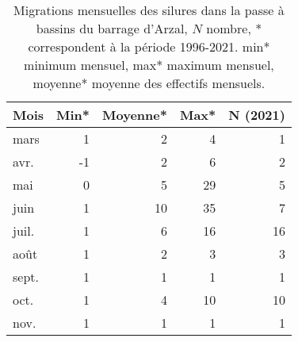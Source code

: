 \begin{table}[htbp]
\centering
\begin{tabular}{lrrrr}
  \hline
Mois & Min* & Moyenne* & Max* & N (2021) \\ 
  \hline
mars & 1 & 2 & 4 & 1 \\ 
  avr. & -1 & 2 & 6 & 2 \\ 
  mai & 0 & 5 & 29 & 5 \\ 
  juin & 1 & 10 & 35 & 7 \\ 
  juil. & 1 & 6 & 16 & 16 \\ 
  août & 1 & 2 & 3 & 3 \\ 
  sept. & 1 & 1 & 1 & 1 \\ 
  oct. & 1 & 4 & 10 & 10 \\ 
  nov. & 1 & 1 & 1 & 1 \\ 
   \hline
\end{tabular}
\caption{Migrations mensuelles des silures dans la passe à bassins du barrage
d'Arzal, $N$ nombre, * correspondent à la période 1996-2021. min* minimum mensuel, max* maximum mensuel, moyenne* moyenne des effectifs mensuels.} 
\label{table_trm_mois}
\end{table}
